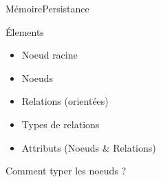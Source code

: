 \begin{frame}{Mémoire}{Persistance}
\begin{block}{Élements}
\begin{itemize}
\item Noeud racine
\item Noeuds
\item Relations (orientées)
\item Types de relations
\item Attributs (Noeuds \& Relations)
\end{itemize}
\end{block}
\begin{block}{Comment typer les noeuds ?}
\begin{enumerate}
\end{enumerate}
\end{block}

\end{frame}